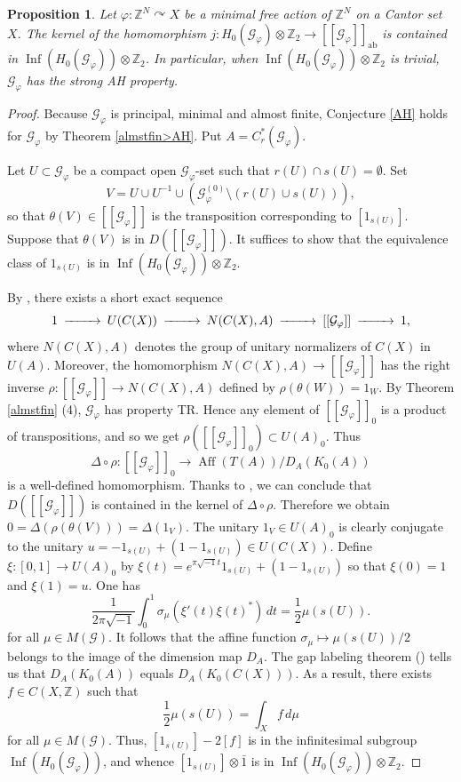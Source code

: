 \documentclass[11pt]{article}
\newtheorem{proposition}[theorem]{Proposition}
\theoremstyle{definition}
\numberwithin{equation}{section}
\renewcommand{\phi}{\varphi}
\newcommand{\Aff}{\operatorname{Aff}}
\newcommand{\Inf}{\operatorname{Inf}}
\newcommand{\ab}{\mathrm{ab}}
\newcommand{\G}{\mathcal{G}}
\newcommand{\Z}{\mathbb{Z}}
\begin{document}
\begin{proposition}\label{signature}
Let $\phi:\Z^N\curvearrowright X$ be a minimal free action of $\Z^N$ 
on a Cantor set $X$. 
The kernel of the homomorphism $j:H_0(\G_\phi)\otimes\Z_2\to[[\G_\phi]]_\ab$ 
is contained in $\Inf(H_0(\G_\phi))\otimes\Z_2$. 
In particular, when $\Inf(H_0(\G_\phi))\otimes\Z_2$ is trivial, 
$\G_\phi$ has the strong AH property. 
\end{proposition}
\begin{proof}
Because $\G_\phi$ is principal, minimal and almost finite, 
Conjecture \ref{AH} holds for $\G_\phi$ by Theorem \ref{almstfin>AH}. 
Put $A=C^*_r(\G_\phi)$. 

Let $U\subset\G_\phi$ be a compact open $\G_\phi$-set 
such that $r(U)\cap s(U)=\emptyset$. 
Set 
\[
V=U\cup U^{-1}\cup(\G_\phi^{(0)}\setminus(r(U)\cup s(U))), 
\]
so that $\theta(V)\in[[\G_\phi]]$ is the transposition 
corresponding to $[1_{s(U)}]$. 
Suppose that $\theta(V)$ is in $D([[\G_\phi]])$. 
It suffices to show that 
the equivalence class of $1_{s(U)}$ is in $\Inf(H_0(\G_\phi))\otimes\Z_2$. 

By \cite[Proposition 5.6]{M12PLMS}, there exists a short exact sequence 
\[
\begin{CD}
1@>>>U(C(X))@>>>N(C(X),A)@>>>[[\G_\phi]]@>>>1, 
\end{CD}
\]
where $N(C(X),A)$ denotes 
the group of unitary normalizers of $C(X)$ in $U(A)$. 
Moreover, 
the homomorphism $N(C(X),A)\to[[\G_\phi]]$ has the right inverse 
$\rho:[[\G_\phi]]\to N(C(X),A)$ defined by $\rho(\theta(W))=1_W$. 
By Theorem \ref{almstfin} (4), $\G_\phi$ has property TR. 
Hence any element of $[[\G_\phi]]_0$ is a product of transpositions, 
and so we get $\rho([[\G_\phi]]_0)\subset U(A)_0$. 
Thus 
\[
\Delta\circ\rho:[[\G_\phi]]_0\to\Aff(T(A))/D_A(K_0(A))
\]
is a well-defined homomorphism. 
Thanks to \cite[Theorem 4.7]{M15crelle}, 
we can conclude that $D([[\G_\phi]])$ is contained 
in the kernel of $\Delta\circ\rho$. 
Therefore we obtain $0=\Delta(\rho(\theta(V)))=\Delta(1_V)$. 
The unitary $1_V\in U(A)_0$ is clearly conjugate to 
the unitary $u=-1_{s(U)}+(1-1_{s(U)})\in U(C(X))$. 
Define $\xi:[0,1]\to U(A)_0$ 
by $\xi(t)=e^{\pi\sqrt{-1}t}1_{s(U)}+(1-1_{s(U)})$ 
so that $\xi(0)=1$ and $\xi(1)=u$. 
One has 
\[
\frac{1}{2\pi\sqrt{-1}}\int_0^1\sigma_\mu(\xi'(t)\xi(t)^*)\,dt
=\frac{1}{2}\mu(s(U)). 
\]
for all $\mu\in M(\G)$. 
It follows that 
the affine function $\sigma_\mu\mapsto\mu(s(U))/2$ belongs to 
the image of the dimension map $D_A$. 
The gap labeling theorem (\cite{BBG06CMP,BO03,KP03Michigan}) tells us that 
$D_A(K_0(A))$ equals $D_A(K_0(C(X)))$. 
As a result, there exists $f\in C(X,\Z)$ such that 
\[
\frac{1}{2}\mu(s(U))=\int_Xf\,d\mu
\]
for all $\mu\in M(\G)$. 
Thus, $[1_{s(U)}]-2[f]$ is in the infinitesimal subgroup $\Inf(H_0(\G_\phi))$, 
and whence $[1_{s(U)}]\otimes\bar{1}$ is in $\Inf(H_0(\G_\phi))\otimes\Z_2$. 
\end{proof}
\end{document}
